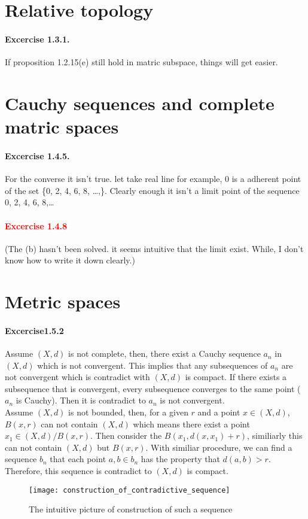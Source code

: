 \section{Relative topology}
\paragraph{Excercise 1.3.1.}If proposition 1.2.15(e) still hold in matric subspace, things will get easier.
\section{Cauchy sequences and complete matric spaces}
\paragraph{Excercise 1.4.5.} For the converse it isn't true. let take real line for example, 0 is a adherent point of the set \{0, 2, 4, 6, 8, \dots,\}. Clearly enough it isn't a limit point of the sequence 0, 2, 4, 6, 8,\dots
\paragraph{\textcolor{red}{Excercise 1.4.8}}(The (b) hasn't been solved. it seems intuitive that the limit exist. While, I don't know how to write it down clearly.)
\section{Metric spaces}
\paragraph{Excercise1.5.2}
Assume $(X,d)$ is not complete, then, there exist a Cauchy sequence $a_{n}$ in $(X,d)$ which is not convergent. This implies that any subsequences of $a_{n}$ are not convergent which is contradict with $(X,d)$ is compact. If there exists a subsequence that is convergent, every subsequence converges to the same point ($a_{n}$ is Cauchy). Then it is contradict to $a_{n}$ is not convergent.\\
Assume $(X,d)$ is not bounded, then, for a given $r$ and a point $x \in (X,d)$, $B(x,r)$ can not contain $(X,d)$ which means there exist a point $x_{1} \in (X,d)/B(x,r)$. Then consider the $B(x_{1},d(x,x_{1})+r)$, similiarly this can not contain $(X,d)$ but $B(x,r)$. With similiar procedure, we can find a sequence $b_{n}$ that each point $a,b\in b_{n}$ has the property that $d(a,b)>r$. Therefore, this sequence is contradict to $(X,d)$ is compact.
\begin{figure}[H]
\centering
\texttt{[image: construction\_of\_contradictive\_sequence]}
\caption{The intuitive picture of construction of such a sequence}
\end{figure}
